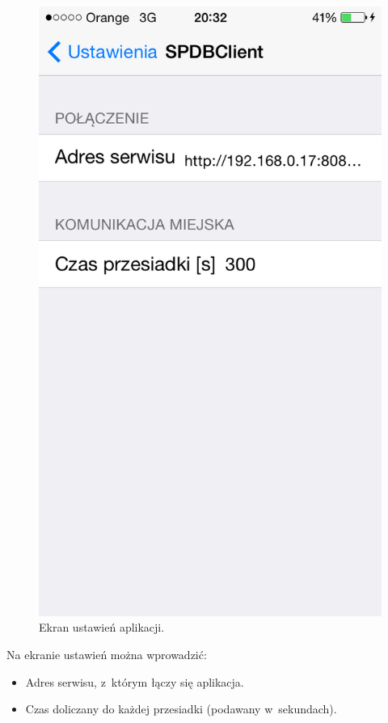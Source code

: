 \documentclass[a4paper,12pt]{article}
\begin{document}
	\begin{figure}[ht!]
		\centering
		\includegraphics[width=\linewidth, height=.4\textheight, keepaspectratio]{graphics/snapshots/settings_screen.png}
		\caption{Ekran ustawień aplikacji.}
		\label{fig:settings_screen}
	\end{figure}

	Na ekranie ustawień można wprowadzić:

	\begin{itemize}
		\item Adres serwisu, z~którym łączy się aplikacja.
		\item Czas doliczany do każdej przesiadki (podawany w~sekundach).
	\end{itemize}
\end{document}
